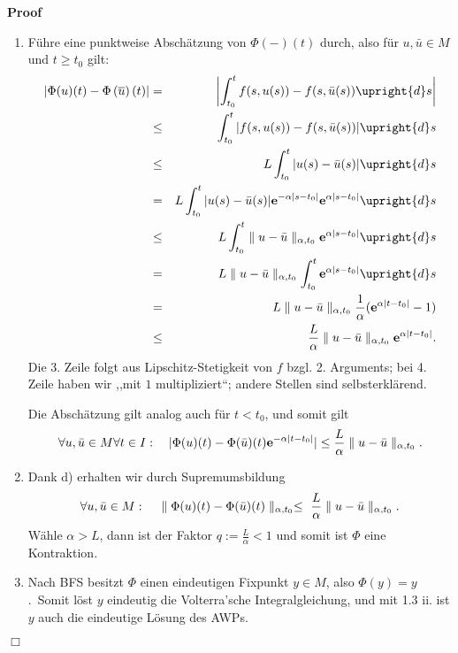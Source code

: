 \documentclass{book}
\newcommand{\assign}{:=}
\newenvironment{enumeratealpha}{\begin{enumerate}[a{\textup{)}}] }{\end{enumerate}}
\newenvironment{proof}{\noindent\textbf{Proof\ }}{\hspace*{\fill}$\Box$\medskip}
\begin{document}
\begin{proof}
\begin{enumeratealpha}
    Zudem ist $\Phi (u) (t_0) = y_0$, also ist $\Phi : M \rightarrow M$ eine
    Selbstabbildung.
    
    Es bleibt noch die Kontraktionseigenschaft zu zeigen.
    
    \item F{\"u}hre eine punktweise Absch{\"a}tzung von $\Phi (-) (t)$ durch,
    also f{\"u}r $u, \bar{u} \in M$ und $t \geq t_0$ gilt:
    \begin{eqnarray*}
      \left| \Phi (u) (t) - \Phi \left( \overline{u} \right) (t) \right| & = &
      \left| \int_{t_0}^t f (s, u (s)) - f (s, \bar{u} (s)) \upright{d} s
      \right|\\
      & \leq & \int_{t_0}^t | f (s, u (s)) - f (s, \bar{u} (s)) | \upright{d}
      s\\
      & \leq & L \int_{t_0}^t | u (s) - \bar{u} (s) | \upright{d} s\\
      & = & L \int_{t_0}^t | u (s) - \bar{u} (s) | \mathbf{e}^{- \alpha | s -
      t_0 |} \mathbf{e}^{\alpha | s - t_0 |}  \upright{d} s\\
      & \leq & L \int_{t_0}^t \parallel u - \bar{u} \parallel_{\alpha, t_0}
      \mathbf{e}^{\alpha | s - t_0 |}  \upright{d} s\\
      & = & L \parallel u - \bar{u} \parallel_{\alpha, t_0} \int_{t_0}^t
      \mathbf{e}^{\alpha | s - t_0 |} \upright{d} s\\
      & = & L \parallel u - \bar{u} \parallel_{\alpha, t_0} \frac{1}{\alpha}
      (\mathbf{e}^{\alpha | t - t_0 |} - 1)\\
      & \leq & \frac{L}{\alpha} \parallel u - \bar{u} \parallel_{\alpha, t_0}
      \mathbf{e}^{\alpha | t - t_0 |} .
    \end{eqnarray*}
    Die 3. Zeile folgt aus Lipschitz-Stetigkeit von $f$ bzgl. 2. Arguments;
    bei 4. Zeile haben wir ,,mit $1$ multipliziert``; andere Stellen sind
    selbsterkl{\"a}rend.
    
    Die Absch{\"a}tzung gilt analog auch f{\"u}r $t < t_0$, und somit gilt
    \[ \forall u, \bar{u} \in M \forall t \in I : \text{\quad} | \Phi (u) (t)
       - \Phi (\bar{u}) (t) \mathbf{e}^{- \alpha | t - t_0 |}  | \leq
       \frac{L}{\alpha} \parallel u - \bar{u} \parallel_{\alpha, t_0} . \]
    \item Dank d) erhalten wir durch Supremumsbildung
    \[ \forall u, \bar{u} \in M : \text{\quad} \parallel \Phi (u) (t) - \Phi
       (\bar{u}) (t) \parallel_{\alpha, t_0} \leq \text{ } \frac{L}{\alpha}
       \parallel u - \bar{u} \parallel_{\alpha, t_0} . \]
    W{\"a}hle $\alpha > L$, dann ist der Faktor $q \assign \frac{L}{\alpha} <
    1$ und somit ist $\Phi$ eine Kontraktion.
    
    \item Nach BFS besitzt $\Phi$ einen eindeutigen Fixpunkt $y \in M$, also
    $\Phi (y) = y$.\quad \ Somit l{\"o}st $y$ eindeutig die Volterra'sche
    Integralgleichung, und mit 1.3 ii. ist $y$ auch die eindeutige L{\"o}sung
    des AWPs. 
  \end{enumeratealpha}
\end{proof}
\end{document}
